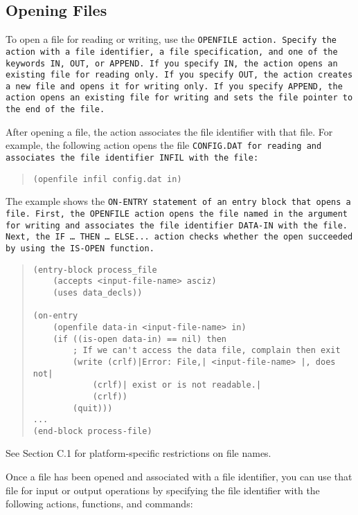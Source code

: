 \subsection{Opening Files}

To open a file for reading or writing, use the \tt{OPENFILE}
action. Specify the action with a file identifier, a file
specification, and one of the keywords IN, \tt{OUT}, or
\tt{APPEND}. If you specify IN, the action opens an existing file for
reading only. If you specify \tt{OUT}, the action creates a new file
and opens it for writing only. If you specify \tt{APPEND}, the action
opens an existing file for writing and sets the file pointer to the
end of the file.

After opening a file, the action associates the file identifier with
that file. For example, the following action opens the file
\tt{CONFIG.DAT} for reading and associates the file identifier
\tt{INFIL} with the file:

\begin{quote}
\begin{verbatim}
(openfile infil config.dat in)
\end{verbatim}
\end{quote}
The example shows the \tt{ON-ENTRY} statement of an entry block that
opens a file. First, the \tt{OPENFILE} action opens the file named in
the argument for writing and associates the file identifier
\tt{DATA-IN} with the file. Next, the \tt{IF} {\ldots} \tt{THEN}
{\ldots} \tt{ELSE}... action checks whether the open succeeded by
using the \tt{IS-OPEN} function.

\begin{quote}
\begin{verbatim}
(entry-block process_file
    (accepts <input-file-name> asciz)
    (uses data_decls))

(on-entry
    (openfile data-in <input-file-name> in)
    (if ((is-open data-in) == nil) then
        ; If we can't access the data file, complain then exit
        (write (crlf)|Error: File,| <input-file-name> |, does not|
            (crlf)| exist or is not readable.|
            (crlf))
        (quit)))
...
(end-block process-file)
\end{verbatim}
\end{quote}

See Section C.1 for platform-specific restrictions on file names.

Once a file has been opened and associated with a file identifier, you
can use that file for input or output operations by specifying the
file identifier with the following actions, functions, and commands:

